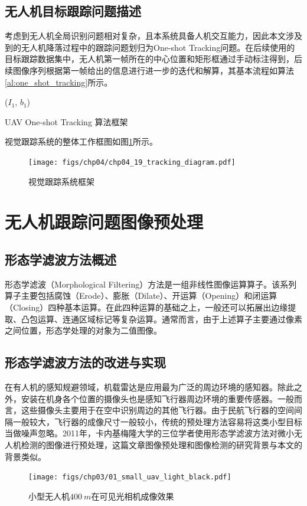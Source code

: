 \subsection{无人机目标跟踪问题描述}
考虑到无人机全局识别问题相对复杂，且本系统具备人机交互能力，因此本文涉及到的无人机降落过程中的跟踪问题划归为One-shot Tracking问题。在后续使用的目标跟踪数据集中，无人机第一帧所在的中心位置和矩形框通过手动标注得到，后续图像序列根据第一帧给出的信息进行进一步的迭代和解算，其基本流程如算法\ref{al:one_shot_tracking}所示。
\begin{algorithm2e}[h]
	\SetAlgoLined
	\BlankLine
	\Initialization($I_1$, $b_1$)\;
	\caption{UAV One-shot Tracking 算法框架}
	\label{al:one_shot_tracking}
\end{algorithm2e}
视觉跟踪系统的整体工作框图如图\ref{fig:chp04_19_tracking_diagram}所示。
\begin{figure}[ht]   
	\centering
	\texttt{[image: figs/chp04/chp04\_19\_tracking\_diagram.pdf]}
	\caption{视觉跟踪系统框架}
	\label{fig:chp04_19_tracking_diagram}
\end{figure}


\section{无人机跟踪问题图像预处理}
\subsection{形态学滤波方法概述}
形态学滤波（Morphological Filtering）方法是一组非线性图像运算算子。该系列算子主要包括腐蚀（Erode）、膨胀（Dilate）、开运算（Opening）和闭运算（Closing）四种基本运算。在此四种运算的基础之上，一般还可以拓展出边缘提取、凸包运算、连通区域标记等复杂运算。通常而言，由于上述算子主要通过像素之间位置，形态学处理的对象为二值图像。
\subsection{形态学滤波方法的改进与实现}
在有人机的感知规避领域，机载雷达是应用最为广泛的周边环境的感知器。除此之外，安装在机身各个位置的摄像头也是感知飞行器周边环境的重要传感器。一般而言，这些摄像头主要用于在空中识别周边的其他飞行器。由于民航飞行器的空间间隔一般较大，飞行器的成像尺寸一般较小，传统的预处理方法容易将这类小型目标当做噪声忽略。2011年，卡内基梅隆大学的三位学者使用形态学滤波方法对微小无人机检测的图像进行预处理\cite{dey2011cascaded}，这篇文章图像预处理和图像检测的研究背景与本文的背景类似。
\begin{figure}[ht]   
	\centering
	\texttt{[image: figs/chp03/01\_small\_uav\_light\_black.pdf]}
	\caption{小型无人机$400\ m$在可见光相机成像效果}
	\label{fig:01_small_uav_light_black}
\end{figure}

